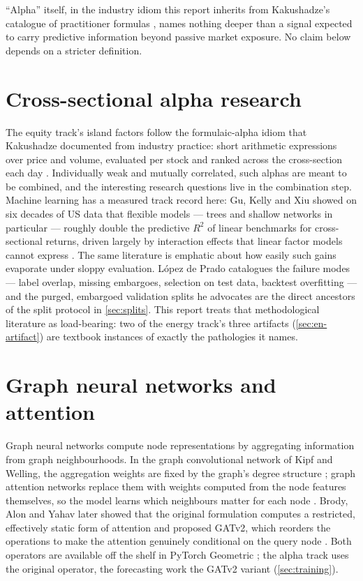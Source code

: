 ``Alpha'' itself, in the industry idiom this report inherits from
Kakushadze's catalogue of practitioner formulas
\cite{kakushadze2016alphas}, names nothing deeper than a signal
expected to carry predictive information beyond passive market
exposure. No claim below depends on a stricter definition.

\section{Cross-sectional alpha research}
\label{sec:bg-alpha}

The equity track's island factors follow the formulaic-alpha idiom that
Kakushadze documented from industry practice: short arithmetic
expressions over price and volume, evaluated per stock and ranked across
the cross-section each day \cite{kakushadze2016alphas}. Individually
weak and mutually correlated, such alphas are meant to be combined, and
the interesting research questions live in the combination step. Machine
learning has a measured track record here: Gu, Kelly and Xiu showed on
six decades of US data that flexible models --- trees and shallow
networks in particular --- roughly double the predictive $R^2$ of linear
benchmarks for cross-sectional returns, driven largely by interaction
effects that linear factor models cannot express
\cite{gu2020empirical}. The same literature is emphatic about how easily
such gains evaporate under sloppy evaluation. L\'opez de Prado catalogues
the failure modes --- label overlap, missing embargoes, selection on
test data, backtest overfitting --- and the purged, embargoed validation
splits he advocates \cite{lopezdeprado2018afml} are the direct ancestors
of the split protocol in \cref{sec:splits}. This report treats that
methodological literature as load-bearing: two of the energy track's
three artifacts (\cref{sec:en-artifact}) are textbook instances of
exactly the pathologies it names.

\section{Graph neural networks and attention}
\label{sec:bg-gnn}

Graph neural networks compute node representations by aggregating
information from graph neighbourhoods. In the graph convolutional
network of Kipf and Welling, the aggregation weights are fixed by the
graph's degree structure \cite{kipf2017gcn}; graph attention networks
replace them with weights computed from the node features themselves, so
the model learns which neighbours matter for each node
\cite{velickovic2018gat}. Brody, Alon and Yahav later showed that the
original formulation computes a restricted, effectively static form of
attention and proposed GATv2, which reorders the operations to make the
attention genuinely conditional on the query node
\cite{brody2022gatv2}. Both operators are available off the shelf in
PyTorch Geometric \cite{fey2019pyg}; the alpha track uses the original
operator, the forecasting work the GATv2 variant
(\cref{sec:training}).

